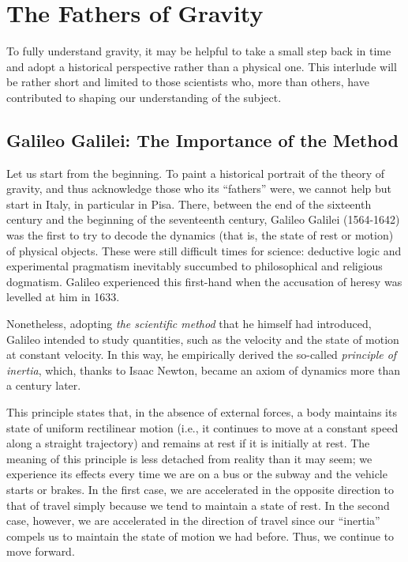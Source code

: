 
\chapter{The Fathers of Gravity}\label{ch:02}

To fully understand gravity, it may be helpful to take a small step back in time and
adopt a historical perspective rather than a physical one. This interlude will be rather
short and limited to those scientists who, more than others, have contributed to shaping
our understanding of the subject.

\section{Galileo Galilei: The Importance of the Method}\label{sec:02-galileo}

Let us start from the beginning. To paint a historical portrait of the theory of
gravity, and thus acknowledge those who its ``fathers'' were, we cannot help but start
in Italy, in particular in Pisa. There, between the end of the sixteenth century and the
beginning of the seventeenth century, Galileo Galilei
(1564-1642) was the first to try to decode the dynamics (that is, the state of rest or
motion) of physical objects. These were still difficult times for science: deductive
logic and experimental pragmatism inevitably succumbed to philosophical and religious
dogmatism. Galileo experienced this first-hand when the accusation of heresy was
levelled at him in 1633.

Nonetheless, adopting \emph{the scientific method} that he himself had introduced,
Galileo intended to study
quantities, such as the velocity and the state of motion at constant velocity. In this
way, he empirically derived the so-called \emph{principle
of} \emph{inertia}, which, thanks to Isaac
Newton, became an axiom of dynamics more than a century later.

This principle states that, in the absence of external forces, a body maintains its
state of uniform rectilinear motion (i.e., it continues to move at a constant speed
along a straight trajectory) and remains at rest if it is initially at rest. The meaning
of this principle is less detached from reality than it may seem; we experience its
effects every time we are on a bus or the subway and the vehicle starts or brakes. In
the first case, we are accelerated in the opposite direction to that of travel simply
because we tend to maintain a state of rest. In the second case, however, we are
accelerated in the direction of travel since our ``inertia'' compels us to maintain the
state of motion we had before. Thus, we continue to move forward.


